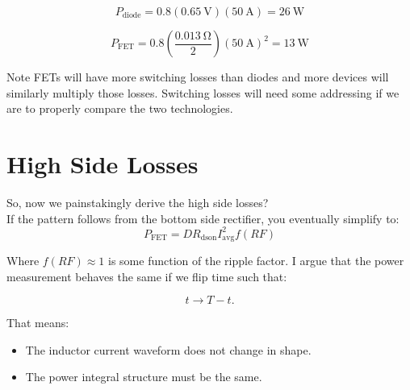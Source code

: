 \documentclass{article}
\begin{document}
\[
P_\text{diode} = \num{0.8} (\qty{0.65}{\volt}) (\qty{50}{\ampere}) = \qty{26}{\watt}
\]

\[
P_\text{FET} = \num{0.8} (\frac{\qty{0.013}{\ohm}}{2}) (\qty{50}{\ampere})^2 = \qty{13}{\watt}
\]

Note FETs will have more switching losses than diodes and more devices will similarly multiply those losses.  Switching losses will need some addressing if we are to properly compare the two technologies.

\section{High Side Losses}
So, now we painstakingly derive the high side losses? \\

If the pattern follows from the bottom side rectifier, you eventually simplify to:
\begin{equation}
P_\text{FET} = D R_\text{dson} I_\text{avg}^2 f(RF)
\end{equation}

Where $f(RF) \approx 1$ is some function of the ripple factor.  I argue that the power measurement behaves the same if we flip time such that:

\[
t \to T - t.
\]

That means:
\begin{itemize}
    \item The inductor current waveform does not change in shape.
    \item The power integral structure must be the same.
\end{itemize}
\end{document}
